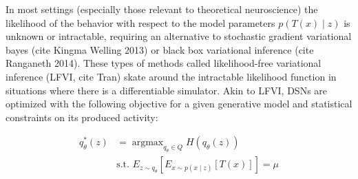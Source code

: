 \documentclass[11pt]{article}
\DeclareMathOperator*{\argmax}{argmax}
\begin{document}
In most settings (especially those relevant to theoretical neuroscience) the likelihood of the behavior with respect to the model parameters $p(T(x) \mid z)$ is unknown or intractable, requiring an alternative to stochastic gradient variational bayes (cite Kingma Welling 2013) or black box variational inference (cite Ranganeth 2014).  These types of methods called likelihood-free variational inference (LFVI, cite Tran) skate around the intractable likelihood function in situations where there is a differentiable simulator. Akin to LFVI, DSNs are optimized with the following objective for a given generative model and statistical constraints on its produced activity:

\begin{equation}
\begin{split}
q_\theta^*(z) &= \argmax_{q_\theta \in Q} H(q_\theta(z)) \\
 &  \text{s.t.  } E_{z \sim q_\theta}\left[ E_{x\sim p(x \mid z)}\left[T(x)\right] \right] = \mu \\
 \end{split}
\end{equation}
\end{document}
